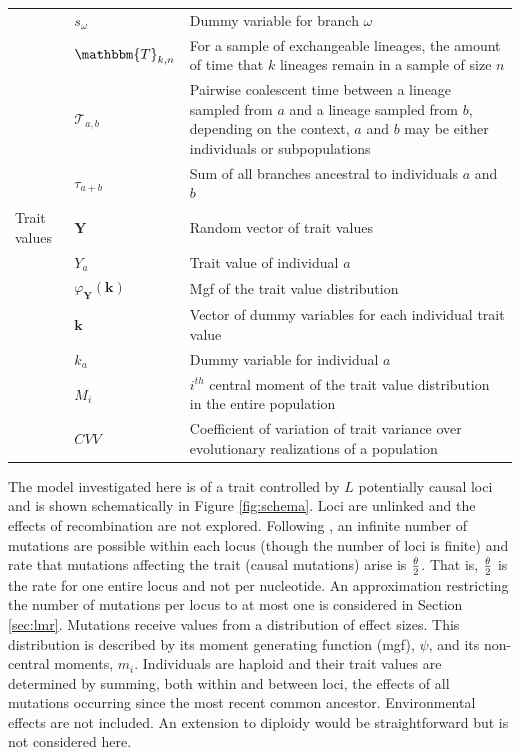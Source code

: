 \begin{table}
\begin{tabular}{l l l}
                                         & $s_\omega$ & Dummy variable for branch $\omega$ \\
                                         & $\mathbbm{T}_{k,n}$ & \multicolumn{1}{p{10cm}}{For a sample of exchangeable lineages, the amount of time that $k$ lineages remain in a sample of size $n$}\\
                                         & $\mathcal{T}_{a,b}$ & \multicolumn{1}{p{10cm}}{Pairwise coalescent time between a lineage sampled from $a$ and a lineage sampled from $b$, depending on the context, $a$ and $b$ may be either individuals or subpopulations}\\
                                         & $\tau_{a+b}$ & Sum of all branches ancestral to individuals $a$ and $b$\\
    Trait values & $\mathbf{Y}$ & Random vector of trait values \\
                                         & $Y_a$ & Trait value of individual $a$\\
                                         & $\varphi_{\mathbf{Y}}(\mathbf{k})$ & Mgf of the trait value distribution \\
                                         & $\mathbf{k}$ & \multicolumn{1}{p{10cm}}{Vector of dummy variables for each individual trait value}\\
                                         & $k_a$ & Dummy variable for individual $a$\\
                                         & $M_i$ & \multicolumn{1}{p{10cm}}{$i^{th}$ central moment of the trait value distribution in the entire population}\\
                                         & $CVV$ & \multicolumn{1}{p{10cm}}{Coefficient of variation of trait variance over evolutionary realizations of a population}\\
    \hline
  \end{tabular}
  \label{notation}
\end{table}

The model investigated here is of a trait controlled by $L$ potentially causal
loci and is shown schematically in Figure \ref{fig:schema}. Loci are unlinked
and the effects of recombination are not explored. Following \citet{Kimura1969},
an infinite number of mutations are possible within each locus (though the
number of loci is finite) and rate that mutations affecting the trait (causal
mutations) arise is $\frac{\theta}{2}$. That is, $\frac{\theta}{2}$ is the rate for one entire locus and not
per nucleotide. An approximation restricting the number of mutations per locus
to at most one is considered in Section \ref{sec:lmr}. Mutations receive values
from a distribution of effect sizes. This distribution is described by its
moment generating function (mgf), $\psi$, and its non-central moments, $m_i$.
Individuals are haploid and their trait values are determined by summing, both
within and between loci, the effects of all mutations occurring since the most
recent common ancestor. Environmental effects are not included. An extension to
diploidy would be straightforward but is not considered here.

